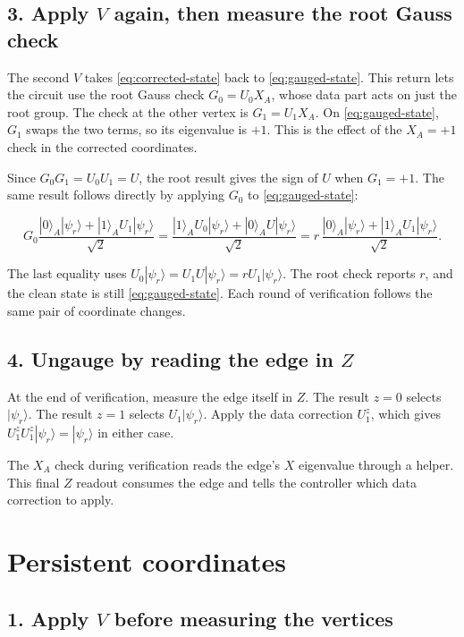 \documentclass[11pt,a4paper]{article}
\begin{document}
\subsection*{3. Apply \(V\) again, then measure the root Gauss check}

The second \(V\) takes \eqref{eq:corrected-state} back to \eqref{eq:gauged-state}. This return lets the circuit use the
root Gauss check \(G_0=U_0X_A\), whose data part acts on just the root group.
The check at the other vertex is \(G_1=U_1X_A\). On \eqref{eq:gauged-state}, \(G_1\) swaps the
two terms, so its eigenvalue is \(+1\). This is the effect of the \(X_A=+1\)
check in the corrected coordinates.

Since \(G_0G_1=U_0U_1=U\), the root result gives the sign of \(U\) when
\(G_1=+1\). The same result follows directly by applying \(G_0\) to \eqref{eq:gauged-state}:

\[
G_0
\frac{|0\rangle_A|\psi_r\rangle+|1\rangle_AU_1|\psi_r\rangle}{\sqrt2}
=
\frac{|1\rangle_A U_0|\psi_r\rangle+|0\rangle_AU|\psi_r\rangle}{\sqrt2}
=
r\,\frac{|0\rangle_A|\psi_r\rangle+|1\rangle_AU_1|\psi_r\rangle}{\sqrt2}.
\]

The last equality uses \(U_0|\psi_r\rangle=U_1U|\psi_r\rangle
=rU_1|\psi_r\rangle\). The root check reports \(r\), and the clean state
is still \eqref{eq:gauged-state}. Each round of verification follows the same pair of
coordinate changes.

\subsection*{4. Ungauge by reading the edge in \(Z\)}

At the end of verification, measure the edge itself in \(Z\). The result
\(z=0\) selects \(|\psi_r\rangle\). The result \(z=1\) selects
\(U_1|\psi_r\rangle\). Apply the data correction \(U_1^z\), which gives
\(U_1^zU_1^z|\psi_r\rangle=|\psi_r\rangle\) in either case.

The \(X_A\) check during verification reads the edge's \(X\) eigenvalue
through a helper. This final \(Z\) readout consumes the edge and tells the
controller which data correction to apply.

\section*{Persistent coordinates}

\subsection*{1. Apply \(V\) before measuring the vertices}
\end{document}
